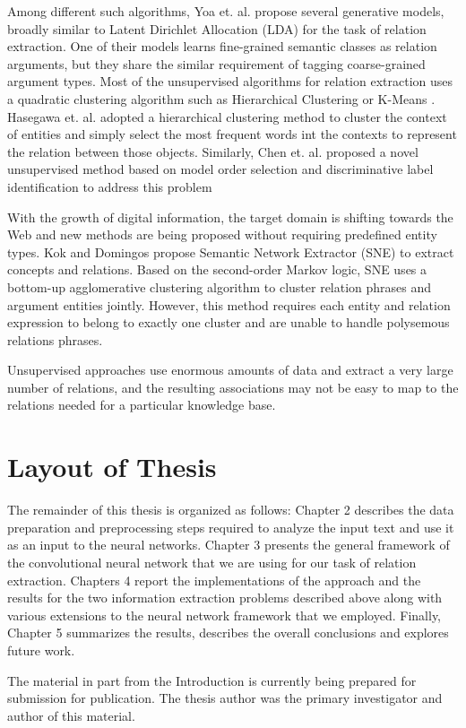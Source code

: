Among different such algorithms, Yoa et. al. \cite{yao2011structured} propose several generative models, broadly similar to Latent Dirichlet Allocation (LDA) for the task of relation extraction. One of their models learns fine-grained semantic classes as relation arguments, but they share the similar requirement of tagging coarse-grained argument types. Most of the unsupervised algorithms for relation extraction uses a quadratic clustering algorithm such as Hierarchical Clustering \cite{hasegawa2004discovering} or K-Means \cite{chen2005unsupervised}. Hasegawa et. al. \cite{hasegawa2004discovering} adopted a hierarchical clustering method to cluster the context of entities and simply select the most frequent words int the contexts to represent the relation between those objects. Similarly, Chen et. al. \cite{chen2005unsupervised} proposed a novel unsupervised method based on model order selection and discriminative label identification to address this problem

With the growth of digital information, the target domain is shifting towards the Web and new methods are being proposed without requiring predefined entity types. Kok and Domingos \cite{kok2008extracting} propose Semantic Network Extractor (SNE) to extract concepts and relations. Based on the second-order Markov logic, SNE uses a bottom-up agglomerative clustering algorithm to cluster relation phrases and argument entities jointly. However, this method requires each entity and relation expression to belong to exactly one cluster and are unable to handle polysemous relations phrases.  

Unsupervised approaches use enormous amounts of data and extract a very large number of relations, and the resulting associations may not be easy to map to the relations needed for a particular knowledge base. 

\section{Layout of Thesis}
\label{section:thesis-layout}
The remainder of this thesis is organized as follows: Chapter 2 describes the data preparation and preprocessing steps required to analyze the input text and use it as an input to the neural networks. Chapter 3 presents the general framework of the convolutional neural network that we are using for our task of relation extraction. Chapters 4 report the implementations of the approach and the results for the two information extraction problems described above along with various extensions to the neural network framework that we employed.  Finally, Chapter 5 summarizes the results, describes the overall conclusions and explores future work.

The material in part from the Introduction is currently being prepared for submission for publication. The thesis author was the primary investigator and author of this material.